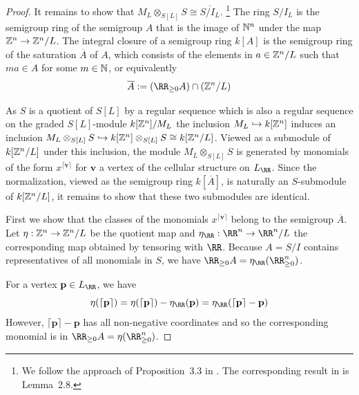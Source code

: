 \documentclass{amsart}
\begin{document}
\begin{proof}
It remains to show that $M_L \otimes_{S[L]} S \cong \overline{S/I_L}$. \footnote{We follow the approach of Proposition~3.3 in \cite{BCHSY}. The corresponding result in \cite{BH25} is Lemma~2.8.}
The ring $S/I_L$ is the semigroup ring of the semigroup $A$ that is the image of $\mathbb N^n$ under the map $\mathbb Z^n \rightarrow \mathbb Z^n/L$. The integral closure of a semigroup ring $k[A]$ is the semigroup ring of the saturation $\overline{A}$ of $A$, which consists of the elements
in $a \in \mathbb Z^n/L$ such that  $ma\in A$ for some $m\in \mathbb N$, or equivalently \cite[***]{eisenbudbook}
\[\overline{A} := (\RR_{\geq 0}A)\cap (\ZZ^n/L) \]


 As $S$ is a quotient of $S[L]$ by a regular sequence which is also a regular sequence on the graded $S[L]$-module  $k[\mathbb Z^n]/M_L$ the inclusion $M_L\hookrightarrow k[\mathbb Z^n]$ induces an inclusion $M_L\otimes_{S[L]} S \hookrightarrow k[\mathbb Z^n]\otimes_{S[L]} S \cong k[\mathbb Z^n/L]$. Viewed as a submodule of $k[\mathbb Z^n/L]$ under this inclusion, the module $M_L\otimes_{S[L]} S$ is generated by monomials of the form $x^{\lceil \mathbf{v}\rceil}$ for $\mathbf{v}$ a vertex of the cellular structure on $L_{\RR}$. Since the normalization, viewed as the semigroup ring $k[\overline{A}]$, is naturally an $S$-submodule of $k[\mathbb Z^n/L]$, it remains to show that these two submodules are identical.

  First we show that the classes of the monomials $x^{\lceil \mathbf{v}\rceil}$ belong to the semigroup $\overline{A}$.
  Let $\eta:\mathbb Z^n\rightarrow \mathbb Z^n/L$ be the quotient map and $\eta_{\RR}:\RR^n\rightarrow \RR^n/L$ the corresponding map obtained by tensoring with $\RR$. 
  Because $A = S/I$ contains
  representatives of all monomials in $S$, we have $ \RR_{\geq 0} A=\eta_\RR(\RR_{\geq 0}^n)$.
  
  For a vertex $\mathbf{p}\in L_{\RR}$, we have
  \[
  \eta(\lceil \mathbf{p}\rceil) =
  \eta(\lceil \mathbf{p}\rceil)-\eta_{\RR}(\mathbf{p}) =
  \eta_\RR(\lceil \mathbf{p}\rceil - \mathbf{p})
  \]
  However, $\lceil \mathbf{p}\rceil - \mathbf{p}$ has all non-negative coordinates and so the corresponding monomial is in $\RR_{\geq 0} A=\eta(\RR_{\geq 0}^n)$.


\end{proof}
\end{document}
